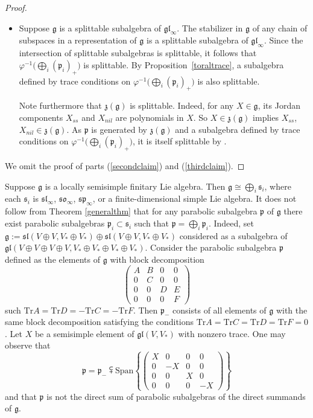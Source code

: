 \documentclass{article}
\newcommand {\tr} {\mathrm{Tr}}
\def\gl{\mathfrak {gl}}
\def\g{\mathfrak {g}}
\def\p{\mathfrak {p}}
\def\sl{\mathfrak{sl}}
\def\so{\mathfrak{so}}
\def\sp{\mathfrak{sp}}
\def\z{\mathfrak {z}}
\def\s{\mathfrak{s}}
\newcommand {\Span}{\mathrm{Span}}
\begin{document}
\begin{proof}
\begin{itemize}
\item[(\ref{firstclaim})]  Suppose $\g$ is a splittable subalgebra of $\gl_\infty$.  The stabilizer in $\g$ of any chain of subspaces in a representation of $\g$ is a splittable subalgebra of $\gl_\infty$.  Since the  intersection of splittable subalgebras is splittable, it follows that $\varphi^{-1} \big( \bigoplus_i (\p_i)_+ \big)$ is splittable.  By Proposition~\ref{toraltrace}, a subalgebra defined by trace conditions on  $\varphi^{-1} \big( \bigoplus_i (\p_i)_+ \big)$ is also splittable.

Note furthermore that $\z(\g)$ is splittable.  Indeed, for any $X \in \g$, its Jordan components $X_{ss}$ and $X_{nil}$  are polynomials in $X$.  So $X \in \z(\g)$ implies $X_{ss}$, $X_{nil} \in \z(\g)$.  As $\p$ is generated by $\z(\g)$ and a subalgebra defined by trace conditions on $\varphi^{-1} \big( \bigoplus_i (\p_i)_+ \big)$, it is itself splittable by \cite[Ch 7 \S 5 Cor 1]{Bourbaki}.
\end{itemize}
We omit the proof of parts (\ref{secondclaim}) and (\ref{thirdclaim}).
\end{proof}


Suppose $\g$ is a locally semisimple finitary Lie algebra.  Then $\g \cong \bigoplus_i \s_i$, where each $\s_i$ is $\sl_\infty$, $\so_\infty$, $\sp_\infty$, or a finite-dimensional simple Lie algebra.  It does not follow from Theorem \ref{generalthm} that for any parabolic subalgebra $\p$ of $\g$ there exist parabolic subalgebras $\p_i \subset \s_i$ such that $\p = \bigoplus_i \p_i$.  Indeed, set $\g := \sl(V \oplus V , V_* \oplus V_*) \oplus \sl(V \oplus V , V_* \oplus V_*)$ considered as a subalgebra of $\gl(V \oplus V \oplus V \oplus V, V_* \oplus V_* \oplus V_* \oplus V_*)$.  Consider the parabolic subalgebra $\p$ defined as the elements of $\g$ with block decomposition
$$\left( \begin{array}{cccc} 
A & B & 0 & 0 \\
0 & C & 0 & 0 \\
0 & 0 & D & E \\
0 & 0 & 0 & F
\end{array} \right)$$
such $\tr A = \tr D = -\tr C = - \tr F$.
Then $\p_-$ consists of all elements of $\g$ with the same block decomposition satisfying the conditions $\tr A = \tr C = \tr D = \tr F = 0$.  Let $X$ be a semisimple element of $\gl(V,V_*)$ with nonzero trace.  One may observe that
$$\p = \p_- \subsetplus \Span \left\{ 
\left( \begin{array}{rrrr} 
X & 0 & 0 & 0 \\
0 & -X & 0 & 0 \\
0 & 0 & X & 0 \\
0 & 0 & 0 & -X
\end{array} \right) \right\}$$
and that $\p$ is not the direct sum of parabolic subalgebras of the direct summands of $\g$.
\end{document}
